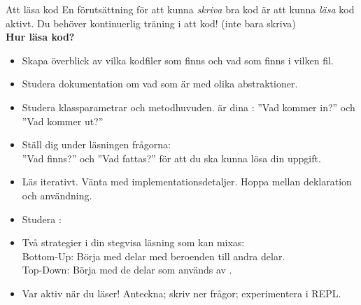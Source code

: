 


\begin{Slide}{Att läsa kod} \SlideFontSmall
  En förutsättning för att kunna \emph{skriva} bra kod är att kunna \emph{läsa} kod aktivt. Du behöver kontinuerlig träning i att  kod! (inte bara skriva)\\ \vspace{0.5em}\textbf{Hur läsa kod?}
  \pause
  \begin{itemize}\SlideFontSmall
    \item Skapa överblick av vilka kodfiler som finns och vad som finns i vilken fil.
    \item Studera dokumentation om vad som är  med olika abstraktioner.
    \item Studera klassparametrar och metodhuvuden.  är dina : ''Vad kommer in?'' och ''Vad kommer ut?''
    \item Ställ dig under läsningen frågorna: \\ ''Vad finns?'' och ''Vad fattas?'' för att du ska kunna lösa din uppgift.
    \item Läs iterativt. Vänta med implementationsdetaljer. Hoppa mellan deklaration och användning.
    \item Studera : 
    \item Två strategier i din stegvisa läsning som kan mixas: \\Bottom-Up: Börja med delar med  beroenden till andra delar. \\ Top-Down: Börja med de delar som används av .
    \item Var aktiv när du läser! Anteckna; skriv ner frågor; experimentera i REPL.
  \end{itemize}
\end{Slide}

